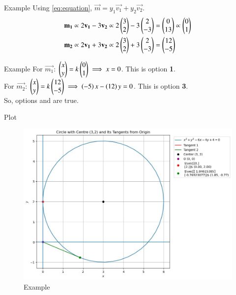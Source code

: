 \documentclass{beamer}
\begin{document}
\begin{frame}{Example}
Using \eqref{eq:equation}, $\vec{m} = y_1\vec{v_1}+y_2\vec{v_2}$.
\begin{align}
    \mathbf{m_1} &\propto 2\mathbf{v_1} - 3\mathbf{v_2} \propto 2\begin{pmatrix}3 \\ 2\end{pmatrix} - 3\begin{pmatrix}2 \\ -3\end{pmatrix} = \begin{pmatrix}0 \\ 13\end{pmatrix} \propto \begin{pmatrix}0 \\ 1\end{pmatrix} \\
    \mathbf{m_2} &\propto 2\mathbf{v_1} + 3\mathbf{v_2} \propto 2\begin{pmatrix}3 \\ 2\end{pmatrix} + 3\begin{pmatrix}2 \\ -3\end{pmatrix} = \begin{pmatrix}12 \\ -5\end{pmatrix}
\end{align}
\end{frame}

\begin{frame}{Example}
For $\vec{m_1}$: $\begin{pmatrix}x \\ y\end{pmatrix} = k\begin{pmatrix}0 \\ 1\end{pmatrix} \implies x = 0$. This is option \textbf{1}. \\
For $\vec{m_2}$: $\begin{pmatrix}x \\ y\end{pmatrix} = k\begin{pmatrix}12 \\ -5\end{pmatrix} \implies \left(-5\right)x - \left(12\right)y = 0$. This is option \textbf{3}. \\
So, options \textbf{} and \textbf{} are true.
\end{frame}

\begin{frame}{Plot}
\begin{figure}
	\centering
	\includegraphics[width=0.7\columnwidth]{../figs/plot_p.jpg}
	\caption{Example}
	\label{fig:example}
\end{figure}
\end{frame}
\end{document}
